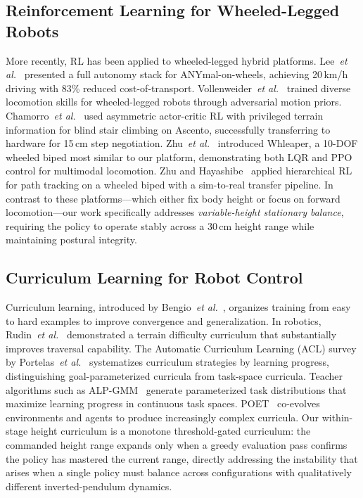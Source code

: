 \documentclass[conference]{IEEEtran}
\begin{document}
\subsection{Reinforcement Learning for Wheeled-Legged Robots}
More recently, RL has been applied to wheeled-legged hybrid platforms.
Lee~\emph{et al.}~\cite{lee2024robustnavigation} presented a full autonomy
stack for ANYmal-on-wheels, achieving 20\,km/h driving with 83\% reduced
cost-of-transport.
Vollenweider~\emph{et al.}~\cite{vollenweider2023advancedskills} trained diverse
locomotion skills for wheeled-legged robots through adversarial motion priors.
Chamorro~\emph{et al.}~\cite{chamorro2024stairclimbing} used asymmetric
actor-critic RL with privileged terrain information for blind stair climbing
on Ascento, successfully transferring to hardware for 15\,cm step negotiation.
Zhu~\emph{et al.}~\cite{whleaper2024} introduced Whleaper, a 10-DOF wheeled
biped most similar to our platform, demonstrating both LQR and PPO control
for multimodal locomotion.
Zhu and Hayashibe~\cite{zhu2022hierarchical} applied hierarchical RL for
path tracking on a wheeled biped with a sim-to-real transfer pipeline.
In contrast to these platforms---which either fix body height or focus on
forward locomotion---our work specifically addresses \emph{variable-height
stationary balance}, requiring the policy to operate stably across a 30\,cm
height range while maintaining postural integrity.

\subsection{Curriculum Learning for Robot Control}
Curriculum learning, introduced by Bengio~\emph{et al.}~\cite{bengio2009curriculum},
organizes training from easy to hard examples to improve convergence
and generalization.
In robotics, Rudin~\emph{et al.}~\cite{rudin2022walk} demonstrated a
terrain difficulty curriculum that substantially improves traversal capability.
The Automatic Curriculum Learning (ACL) survey by
Portelas~\emph{et al.}~\cite{portelas2020acl} systematizes curriculum strategies
by learning progress, distinguishing goal-parameterized curricula from
task-space curricula.
Teacher algorithms such as ALP-GMM~\cite{portelas2020teacher} generate
parameterized task distributions that maximize learning progress in
continuous task spaces.
POET~\cite{wang2019poet} co-evolves environments and agents to produce
increasingly complex curricula.
Our within-stage height curriculum is a monotone threshold-gated curriculum:
the commanded height range expands only when a greedy evaluation pass
confirms the policy has mastered the current range, directly addressing
the instability that arises when a single policy must balance across
configurations with qualitatively different inverted-pendulum dynamics.
\end{document}
